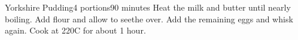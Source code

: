 
\begin{recipe}{Yorkshire Pudding}{4 portions}{90 minutes}
Heat the milk and butter until nearly boiling. Add flour and allow to
seethe over.
Add the remaining eggs and whisk again. Cook at 220\0C for about 1 hour.
\end{recipe}
